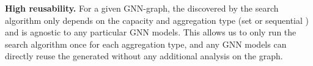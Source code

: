 {\bf High reusability.} For a given GNN-graph, the \xg discovered by the search algorithm only depends on the capacity and aggregation type (set or sequential ) and is agnostic to any particular GNN models.
This allows us to only run the search algorithm once for each aggregation type, and any GNN models can directly reuse the generated \xgs without any additional analysis on the graph.
